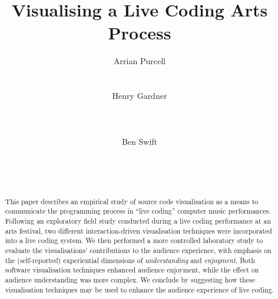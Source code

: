 \documentclass{sig-alternate}
\begin{document}

\title{Visualising a Live Coding Arts Process}

\author{
\alignauthor Arrian Purcell\\
       \\
       \\
\alignauthor Henry Gardner\\
       \\
       \\
       \\
\alignauthor Ben Swift\\
       \\
       \\
       \\
}

\maketitle
\begin{abstract}
  This paper describes an empirical study of source code visualisation
  as a means to communicate the programming process in ``live coding''
  computer music performances. Following an exploratory field study
  conducted during a live coding performance at an arts festival, two
  different interaction-driven visualisation techniques were
  incorporated into a live coding system. We then performed a more
  controlled laboratory study to evaluate the visualisations'
  contributions to the audience experience, with emphasis on the
  (self-reported) experiential dimensions of \emph{understanding} and
  \emph{enjoyment}. Both software visualisation techniques enhanced
  audience enjoyment, while the effect on audience understanding was
  more complex. We conclude by suggesting how these visualisation
  techniques may be used to enhance the audience experience of live
  coding.
\end{abstract}


\end{document}
